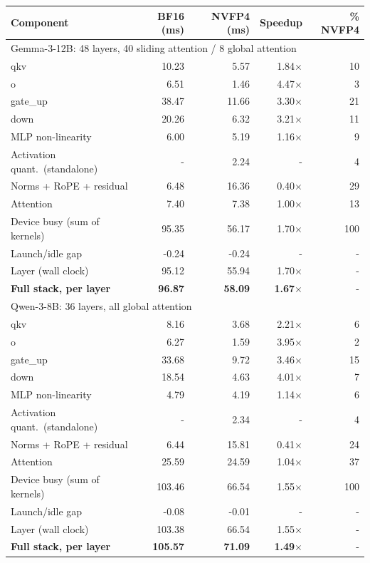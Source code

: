 \begin{tabular}{lrrrr}
\toprule
Component & BF16 (ms) & NVFP4 (ms) & Speedup & \% NVFP4 \\
\midrule
\multicolumn{5}{l}{Gemma-3-12B: 48 layers, 40 sliding attention / 8 global attention} \\
\midrule
qkv & 10.23 & 5.57 & 1.84$\times$ & 10 \\
o & 6.51 & 1.46 & 4.47$\times$ & 3 \\
gate\_up & 38.47 & 11.66 & 3.30$\times$ & 21 \\
down & 20.26 & 6.32 & 3.21$\times$ & 11 \\
MLP non-linearity & 6.00 & 5.19 & 1.16$\times$ & 9 \\
Activation quant.\ (standalone) & - & 2.24 & - & 4 \\
Norms + RoPE + residual & 6.48 & 16.36 & 0.40$\times$ & 29 \\
Attention & 7.40 & 7.38 & 1.00$\times$ & 13 \\
\midrule
Device busy (sum of kernels) & 95.35 & 56.17 & 1.70$\times$ & 100 \\
Launch/idle gap & -0.24 & -0.24 & - & - \\
Layer (wall clock) & 95.12 & 55.94 & 1.70$\times$ & - \\
\textbf{Full stack, per layer} & \textbf{96.87} & \textbf{58.09} & \textbf{1.67}$\times$ & - \\
\midrule
\multicolumn{5}{l}{Qwen-3-8B: 36 layers, all global attention} \\
\midrule
qkv & 8.16 & 3.68 & 2.21$\times$ & 6 \\
o & 6.27 & 1.59 & 3.95$\times$ & 2 \\
gate\_up & 33.68 & 9.72 & 3.46$\times$ & 15 \\
down & 18.54 & 4.63 & 4.01$\times$ & 7 \\
MLP non-linearity & 4.79 & 4.19 & 1.14$\times$ & 6 \\
Activation quant.\ (standalone) & - & 2.34 & - & 4 \\
Norms + RoPE + residual & 6.44 & 15.81 & 0.41$\times$ & 24 \\
Attention & 25.59 & 24.59 & 1.04$\times$ & 37 \\
\midrule
Device busy (sum of kernels) & 103.46 & 66.54 & 1.55$\times$ & 100 \\
Launch/idle gap & -0.08 & -0.01 & - & - \\
Layer (wall clock) & 103.38 & 66.54 & 1.55$\times$ & - \\
\textbf{Full stack, per layer} & \textbf{105.57} & \textbf{71.09} & \textbf{1.49}$\times$ & - \\
\bottomrule
\end{tabular}
